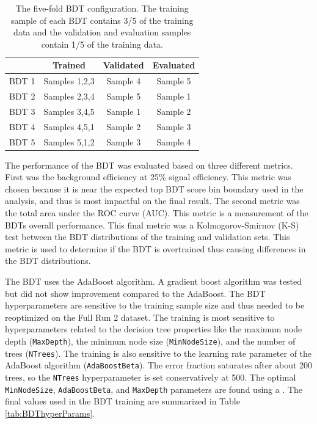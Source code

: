 \begin{table}[!hbp]
    \centering
    \begin{tabular}{|c|c|c|c|}
    \hline
    & Trained & Validated & Evaluated\\
    \hline
    BDT 1 & Samples 1,2,3 & Sample 4 & Sample 5\\
    BDT 2 & Samples 2,3,4 & Sample 5 & Sample 1\\
    BDT 3 & Samples 3,4,5 & Sample 1 & Sample 2\\
    BDT 4 & Samples 4,5,1 & Sample 2 & Sample 3\\
    BDT 5 & Samples 5,1,2 & Sample 3 & Sample 4\\
    \hline
    \end{tabular}
    \caption{The five-fold BDT configuration. The training sample of each BDT contains 3/5 of the training data and the validation and evaluation samples contain 1/5 of the training data. }\label{tab:BDT5FoldConfig}
  \end{table}

The performance of the BDT was evaluated based on three different metrics. First was the background efficiency at 25\% signal efficiency. This metric was chosen because it is near the expected top BDT score bin boundary used in the analysis, and thus is most impactful on the final result. The second metric was the total area under the ROC curve (AUC). This metric is a measurement of the BDTs overall performance. This final metric was a Kolmogorov-Smirnov (K-S) test between the BDT distributions of the training and validation sets. This metric is used to determine if the BDT is overtrained thus causing differences in the BDT distributions. 

The BDT uses the AdaBoost algorithm. A gradient boost algorithm was tested but did not show improvement compared to the AdaBoost. The BDT hyperparameters are sensitive to the training sample size and thus needed to be reoptimized on the Full Run 2 dataset. The training is most sensitive to hyperparameters related to the decision tree properties like the maximum node depth (\texttt{MaxDepth}), the minimum node size (\texttt{MinNodeSize}), and the number of trees (\texttt{NTrees}). The training is also sensitive to the learning rate parameter of the AdaBoost algorithm (\texttt{AdaBoostBeta}). The error fraction saturates after about 200 trees, so the \texttt{NTrees} hyperparameter is set conservatively at 500. The optimal \texttt{MinNodeSize}, \texttt{AdaBoostBeta}, and \texttt{MaxDepth} parameters are found using a . The final values used in the BDT training are summarized in Table \ref{tab:BDThyperParams}. 

